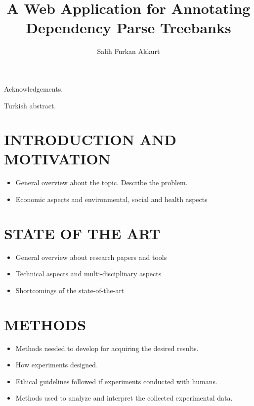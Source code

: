\documentclass[a4paper,onesided,12pt]{report}
\title{A Web Application for Annotating Dependency Parse Treebanks}
\author{Salih Furkan Akkurt}
\begin{document}
\makebstitle  %
\makeapprovalpage
\begin{acknowledgements}
Acknowledgements.
\end{acknowledgements}



\begin{ozet}
    Turkish abstract.
\end{ozet}
\tableofcontents
\listoffigures
\listoftables
\begin{symbols}


\end{symbols}

\begin{abbreviations}
\end{abbreviations}

\chapter{INTRODUCTION AND MOTIVATION}
\label{chapter:introduction}
\begin{itemize}
\item General overview about the topic. Describe the problem.
\item Economic aspects and environmental, social and health aspects
\end{itemize}

\chapter{STATE OF THE ART}
\label{chapter:state-of-the-art}
\begin{itemize}
\item General overview about research papers and tools
\item Technical aspects and multi-disciplinary aspects
\item Shortcomings of the state-of-the-art
\end{itemize}

\chapter{METHODS}
\label{chapter:methods}
\begin{itemize}
\item Methods needed to develop for acquiring the desired results.
\item How experiments designed.
\item Ethical guidelines followed if experiments conducted with humans.
\item Methods used to analyze and interpret the collected experimental data.
\end{itemize}
\end{document}
